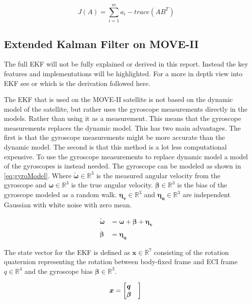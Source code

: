 \begin{equation}\label{eq:Wahba'sProblemReformul}
	J(A) = \sum\limits_{i=1}^{m}a_i - trace(AB^T)
\end{equation}

\subsection{Extended Kalman Filter on MOVE-II}\label{chap:EKF_MOVE_II}
The full EKF will not be fully explained or derived in this report. Instead the key features and implementations will be highlighted. For a more in depth view into EKF see \cite{DavidThesis} or \cite{indirectKalman} which is the derivation followed here.  

The EKF that is used on the MOVE-II satellite is not based on the dynamic model of the satellite, but rather uses the gyroscope measurements directly in the models. Rather than using it as a measurement. This means that the gyroscope measurements replaces the dynamic model. This has two main advantages. The first is that the gyroscope measurements might be more accurate than the dynamic model. The second is that this method is a lot less computational expensive. To use the gyroscope measurements to replace dynamic model a model of the gyroscopes is instead needed. The gyroscope can be modeled as shown in \autoref{eq:gyroModel}. Where $\tilde{\boldsymbol{\omega}} \in \mathbb{R}^{3}$ is the measured angular velocity from the gyroscope and $\boldsymbol{\omega} \in \mathbb{R}^{3}$ is the true angular velocity. $\boldsymbol{\beta} \in \mathbb{R}^{3}$ is the bias of the gyroscope modeled as a random walk. $\boldsymbol{\eta_v} \in \mathbb{R}^{3}$ and $\boldsymbol{\eta_u} \in \mathbb{R}^{3}$ are independent Gaussian with white noise with zero mean.               

\begin{align}
	\tilde{\boldsymbol{\omega}} &= \boldsymbol{\omega} + \boldsymbol{\beta} + \boldsymbol{\eta_v}\label{eq:gyroModel}\\
	\dot{\boldsymbol{\beta}} &= \boldsymbol{\eta_u}\label{eq:randomWalk} 
\end{align}

The state vector for the EKF is defined as $\boldsymbol{x} \in \mathbb{R}^{7}$ consisting of the rotation quaternion representing the rotation between body-fixed frame and ECI frame $q \in \mathbb{R}^{4}$ and the gyroscope bias $\boldsymbol{\beta} \in \mathbb{R}^{3}$.

\begin{equation}\label{eq:stateVectorEKF}
	\boldsymbol{x} = \begin{bmatrix}
    		\boldsymbol{q} \\ \boldsymbol{\beta} & 
		 \end{bmatrix}\\
\end{equation}


